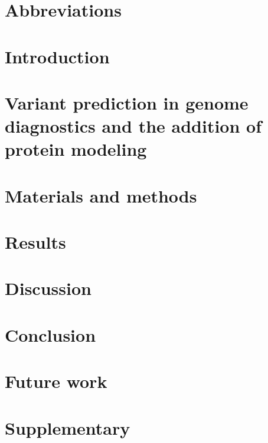 \documentclass[10pt]{article}
\begin{document}
	\section*{Abbreviations}
	
	\label{section:Chap_Abbreviations}
	\newpage
	
	\tableofcontents
	\newpage
	
	\listoffigures
	\newpage
	
	\listoftables
	\newpage
	
	
	\section{Introduction}
	
	\label{section:Chap_Introduction}
	\newpage
	
	
	\section[Theory]{Variant prediction in genome diagnostics and the addition of protein modeling}
	
	\label{section:Chap_Variant_Prediction_In_Genome_Diagnostics}
	\newpage
	
	
	\label{section:Chap_PMT}
	\newpage
	
	
	\label{section:Chap_Monte_Carlo}
	\newpage
	
	
	\label{section:Chap_Cell_Death}
	\newpage
	
	\section{Materials and methods}
	
	\label{section:Chap_Material_and_Methods}
	\newpage
	
	\section{Results}
	
	\label{section:Chap_Results}
	\newpage
	
	\section{Discussion}
	
	\label{section:Chap_Discussion}
	\newpage
	
	\section{Conclusion}
	
	\label{section:Chap_Conclusion}
	\section{Future work}
	
	\label{section:Chap_Future_Work}
	\newpage
	
	
	\printbibliography
	\newpage
	
	\section*{Supplementary}
	
	\label{section:Chap_Supplementary}
	\newpage
	

	
	
\end{document}

